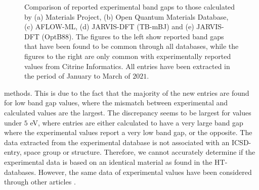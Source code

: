 \clearpage
\begin{figure}[ht!]
    \centering
    \begin{subfigure}[t]{1\textwidth}
        \centering
        
        \caption{}
    \end{subfigure}%

    \begin{subfigure}[t]{1\textwidth}
        \centering
        
        \caption{}
    \end{subfigure}

    \begin{subfigure}[t]{1\textwidth}
        \centering
        
        \caption{}
    \end{subfigure}
\end{figure}

\begin{figure}[t!]\ContinuedFloat
    \centering
    \begin{subfigure}[t]{1\textwidth}
        \centering
        
        \caption{}
    \end{subfigure}%

    \begin{subfigure}[t]{1\textwidth}
        \centering
        
        \caption{}
    \end{subfigure}
    \vspace*{-130mm}
    \caption{Comparison of reported experimental band gaps to those calculated by (a) Materials Project, (b) Open Quantum Materials Database, (c) AFLOW-ML, (d) JARVIS-DFT (TB-mBJ) and (e) JARVIS-DFT (OptB88). The figures to the left show reported band gaps that have been found to be common through all databases, while the figures to the right are only common with experimentally reported values from Citrine Informatics. All entries have been extracted in the period of January to March of $2021$. }
    \label{fig:band gaps}
\end{figure}

\clearpage

\noindent methods.
This is due to the fact that the majority of the new entries are found for low band gap values, where the mismatch between experimental and calculated values are the largest.
The discrepancy seems to be largest for values under $5$ eV, where entries are either calculated to have a very large band gap where the experimental values report a very low band gap, or the opposite.
The data extracted from the experimental database is not associated with an ICSD-entry, space group or structure. Therefore, we cannot accurately determine if the experimental data is based on an identical material as found in the HT-databases. However, the same data of experimental values have been considered through other articles \cite{Ward2018, Ferrenti2020}.

